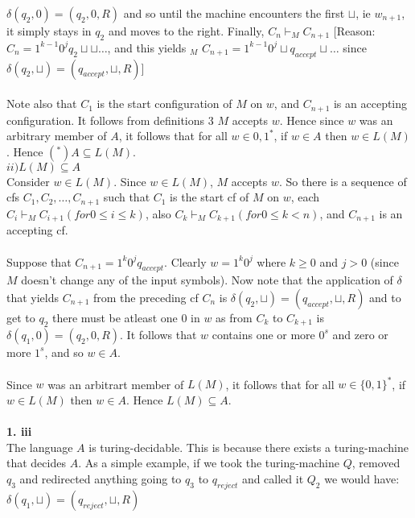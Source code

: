 \documentclass[a4paper,12pt]{article}
\begin{document}
$\delta ( q_2 , 0 ) = ( q_2 , 0 , R )$ and so until the machine encounters the first $\sqcup$, ie $w_{n+1}$, it simply stays in $q_2$ and moves to the right. Finally, $C_n \vdash_M C_{n+1}$ [Reason: $C_n = 1^{k-1} 0^j q_2 \sqcup \sqcup \dots$, and this yields $_M$ $C_{n+1} = 1^{k-1} 0^j \sqcup q_{accept} \sqcup \dots$ since $\delta ( q_2 , \sqcup ) = ( q_{accept} , \sqcup , R )$]  \\
\\
Note also that $C_1$ is the start configuration of $M$ on $w$, and $C_{n+1}$ is an accepting configuration. It follows from definitions 3 $M$ accepts $w$. Hence since $w$ was an arbitrary member of $A$, it follows that for all $w \in {0,1}^*$, if $w \in A$ then $w \in L(M)$. Hence $(^*) A \subseteq L(M)$. \\

\newpage
$ii) L(M) \subseteq A$ \\
Consider $w \in L(M)$. Since $w \in L(M)$, $M$ accepts $w$. So there is a sequence of cfs $C_1, C_2, \dots, C_{n+1}$ such that $C_1$ is the start cf of $M$ on $w$, each $C_i \vdash_M C_{i+1} (for 0 \leq i \leq k)$, also $C_k \vdash_M C_{k+1} (for 0 \leq k < n)$, and $C_{n+1}$ is an accepting cf. \\
\\
Suppose that $C_{n+1} = 1^k 0^j q_{accept}$. Clearly $w = 1^k 0^j$ where $k \geq 0$ and $j > 0$ (since $M$ doesn't change any of the input symbols). Now note that the application of $\delta$ that yields $C_{n+1}$ from the preceding cf $C_n$ is $\delta(q_2, \sqcup) = (q_{accept}, \sqcup, R)$ and to get to $q_2$ there must be atleast one $0$ in $w$ as from $C_k$ to $C_{k+1}$ is $\delta(q_1, 0) = (q_2, 0, R)$. It follows that $w$ contains one or more $0^s$ and zero or more $1^s$, and so $w \in A$. \\
\\
Since $w$ was an arbitrart member of $L(M)$, it follows that for all $w \in \{0, 1\}^*$, if $w \in L(M)$ then $w \in A$. Hence $L(M) \subseteq A$. \\
\\
\textbf{1. iii} \\
The language $A$ is turing-decidable. This is because there exists a turing-machine that decides $A$. As a simple example, if we took the turing-machine $Q$, removed $q_3$ and redirected anything going to $q_3$ to $q_{reject}$ and called it $Q_2$ we would have: \\
$\delta ( q_1 , \sqcup ) = ( q_{reject} , \sqcup , R )$ \\
\end{document}

